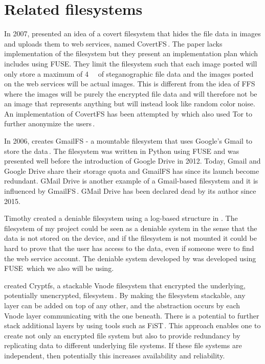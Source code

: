 \section{Related filesystems}
In 2007, \citeauthor{baliga2007web} presented an idea of a covert filesystem that hides the file data in images and uploads them to web services, named CovertFS\,\cite{baliga2007web}. The paper lacks implementation of the filesystem but they present an implementation plan which includes using FUSE. They limit the filesystem such that each image posted will only store a maximum of \SI{4}{\kilo\byte} of steganographic file data and the images posted on the web services will be actual images. This is different from the idea of FFS where the images will be purely the encrypted file data and will therefore not be an image that represents anything but will instead look like random color noise. An implementation of CovertFS has been attempted by \citeauthor{sosaSuperSecretFile2007} which also used Tor to further anonymize the users\,\cite{sosaSuperSecretFile2007}.


In 2006, \citeauthor{jonesGoogleHackUse2006} creates GmailFS - a mountable filesystem that uses Google's Gmail to store the data\,\cite{jonesGoogleHackUse2006, jonesGmailFilesystemImplementation2006}. The filesystem was written in Python using FUSE and was presented well before the introduction of Google Drive in 2012. Today, Gmail and Google Drive share their storage quota and GmailFS has since its launch become redundant. GMail Drive is another example of a Gmail-based filesystem and it is influenced by GmailFS\,\cite{viksoeViksoeDkGMail2004}. GMail Drive has been declared dead by its author since 2015.

Timothy \citeauthor{petersDEFYDeniableFile2014} created a deniable filesystem using a log-based structure in \citeyear{petersDEFYDeniableFile2014}\cite{petersDEFYDeniableFile2014}. The filesystem of my project could be seen as a deniable system in the sense that the data is not stored on the device, and if the filesystem is not mounted it could be hard to prove that the user has access to the data, even if someone were to find the web service account. The deniable system developed by \citeauthor{petersDEFYDeniableFile2014} was developed using FUSE\,\cite{Libfuse2021} which we also will be using.

\citeauthor{badulescuCryptfsStackableVnode1998} created Cryptfs, a stackable Vnode filesystem that encrypted the underlying, potentially unencrypted, filesystem\,\cite{badulescuCryptfsStackableVnode1998}. By making the filesystem stackable, any layer can be added on top of any other, and the abstraction occurs by each Vnode layer communicating with the one beneath. There is a potential to further stack additional layers by using tools such as FiST\,\cite{FiSTStackableFile}. This approach enables one to create not only an encrypted file system but also to provide redundancy by replicating data to different
underlying file systems. If these file systems are independent, then potentially this increases availability and reliability.
